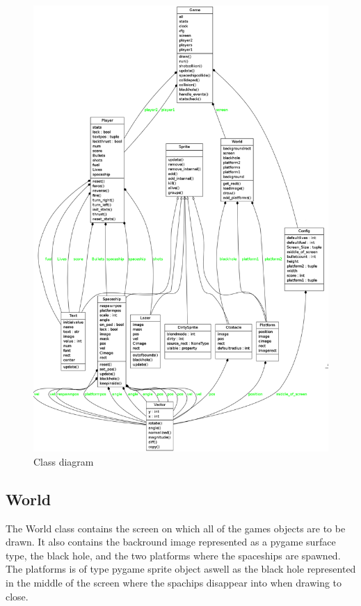 \documentclass{article}
\begin{document}
\begin{figure}[hbtp]
\caption{Class diagram}
\centering
\includegraphics[scale=0.3]{classdiagram.png}
\end{figure}
\newpage

\subsection{World}
The World class contains the screen on which all of the games objects are to be drawn. It also contains the backround image represented as a pygame surface type, the black hole, and the two platforms where the spaceships are spawned. The platforms is of type pygame sprite object aswell as the black hole represented in the middle of the screen where the spachips disappear into when drawing to close.
\end{document}
